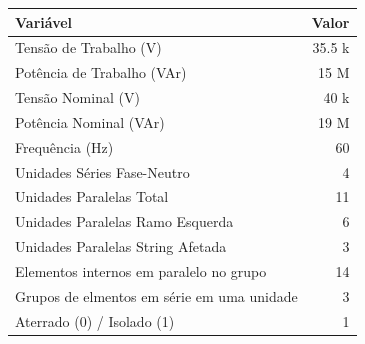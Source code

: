 \centering
\begin{tabular}{lr}
\hline
\textbf{Variável} & \textbf{Valor} \\
\hline
Tensão de Trabalho (V) & 35.5 k \\
Potência de Trabalho (VAr) & 15 M \\
Tensão Nominal (V) & 40 k \\
Potência Nominal (VAr) & 19 M \\
Frequência (Hz) & 60  \\
Unidades Séries Fase-Neutro & 4  \\
Unidades Paralelas Total & 11  \\
Unidades Paralelas Ramo Esquerda & 6  \\
Unidades Paralelas String Afetada & 3  \\
Elementos internos em paralelo no grupo & 14  \\
Grupos de elmentos em série em uma unidade & 3  \\
Aterrado (0) / Isolado (1) & 1  \\
\hline
\end{tabular}
